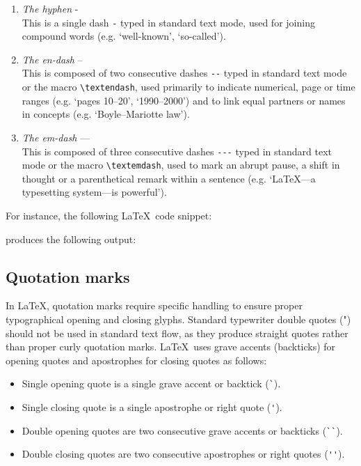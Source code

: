 		\begin{enumerate}
			\item \emph{The hyphen} -\\
			This is a single dash \lstinline|-| typed in standard text mode, used for joining compound words (e.g. `well-known', `so-called').
			
			\item \emph{The en-dash} --\\
			This is composed of two consecutive dashes \lstinline|--| typed in standard text mode or the macro \lstinline|\textendash|, used primarily to indicate numerical, page or time ranges (e.g. `pages 10--20', `1990--2000') and to link equal partners or names in concepts (e.g. `Boyle--Mariotte law').
			
			\item \emph{The em-dash} ---\\
			This is composed of three consecutive dashes \lstinline|---| typed in standard text mode or the macro \lstinline|\textemdash|, used to mark an abrupt pause, a shift in thought or a parenthetical remark within a sentence (e.g. `\LaTeX---a typesetting system---is powerful').
		\end{enumerate}
		
		For instance, the following \LaTeX\ code snippet:

		produces the following output:
	
	\subsection{Quotation marks}
		In \LaTeX, quotation marks require specific handling to ensure proper typographical opening and closing glyphs. Standard typewriter double quotes (") should not be used in standard text flow, as they produce straight quotes rather than proper curly quotation marks. \LaTeX\ uses grave accents (backticks) for opening quotes and apostrophes for closing quotes as follows:
		\begin{itemize}
			\item Single opening quote is a single grave accent or backtick (\lstinline|`|).
			\item Single closing quote is a single apostrophe or right quote (\lstinline|'|).
			\item Double opening quotes are two consecutive grave accents or backticks (\lstinline|``|).
			\item Double closing quotes are two consecutive apostrophes or right quotes (\lstinline|''|).
		\end{itemize}
		
